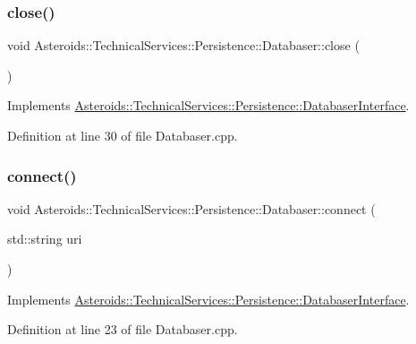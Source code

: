\subsubsection{\texorpdfstring{close()}{close()}}
{\footnotesize\ttfamily void Asteroids\+::\+Technical\+Services\+::\+Persistence\+::\+Databaser\+::close (\begin{DoxyParamCaption}{ }\end{DoxyParamCaption})\hspace{0.3cm}{\ttfamily [virtual]}}



Implements \hyperlink{classAsteroids_1_1TechnicalServices_1_1Persistence_1_1DatabaserInterface_a2c10f4a7500c8285924164334d133aae}{Asteroids\+::\+Technical\+Services\+::\+Persistence\+::\+Databaser\+Interface}.



Definition at line 30 of file Databaser.\+cpp.

\mbox{\label{classAsteroids_1_1TechnicalServices_1_1Persistence_1_1Databaser_aa7dc4f3b86f7966260d6f5d391d4a3ba}} 
\subsubsection{\texorpdfstring{connect()}{connect()}}
{\footnotesize\ttfamily void Asteroids\+::\+Technical\+Services\+::\+Persistence\+::\+Databaser\+::connect (\begin{DoxyParamCaption}\item[{std\+::string}]{uri }\end{DoxyParamCaption})\hspace{0.3cm}{\ttfamily [virtual]}}



Implements \hyperlink{classAsteroids_1_1TechnicalServices_1_1Persistence_1_1DatabaserInterface_a5ad374ce9c8f0fc04b224a85417b4742}{Asteroids\+::\+Technical\+Services\+::\+Persistence\+::\+Databaser\+Interface}.



Definition at line 23 of file Databaser.\+cpp.

\mbox{\label{classAsteroids_1_1TechnicalServices_1_1Persistence_1_1Databaser_a0686831c03a3eabced8649a2e189fef1}} 

